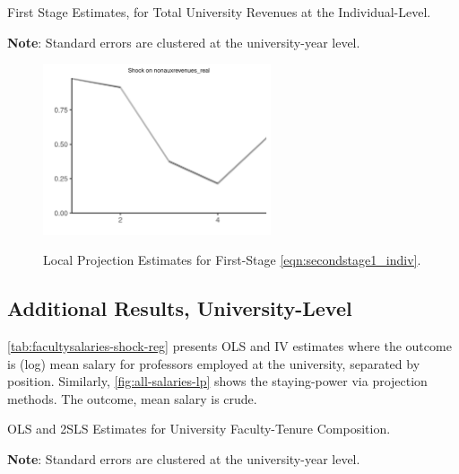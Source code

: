 \documentclass[notitlepage,12pt]{article}
\begin{document}
\begin{table}[H]
    \singlespacing
    \centering
    \caption{First Stage Estimates, for Total University Revenues at the Individual-Level.}
    \makebox[\textwidth][c]{}
    \label{tab:firststage-illinois}
    \begin{flushleft}
        \footnotesize
        \textbf{Note}: Standard errors are clustered at the university-year level.
    \end{flushleft}
\end{table}


\begin{figure}[h!]
    \centering
    \singlespacing
    \caption{Local Projection Estimates for First-Stage \autoref{eqn:secondstage1_indiv}.}
    \includegraphics[width=0.6\textwidth]{figures/firststage-illinois-lp-rolling.png}
    \label{fig:firststage-illinois-lp}
\end{figure}


\subsection{Additional Results, University-Level}

\autoref{tab:facultysalaries-shock-reg} presents OLS and IV estimates where the outcome is (log) mean salary for professors employed at the university, separated by position.
Similarly, \autoref{fig:all-salaries-lp} shows the staying-power via projection methods.
The outcome, mean salary is crude.

\begin{table}[H]
    \singlespacing
    \centering
    \caption{OLS and 2SLS Estimates for University Faculty-Tenure Composition.}
    \makebox[\textwidth][c]{}
    \begin{flushleft}
        \footnotesize
        \textbf{Note}: Standard errors are clustered at the university-year level.
    \end{flushleft}
    \label{tab:tenurecount-shock-reg-fte}
\end{table}
\end{document}
